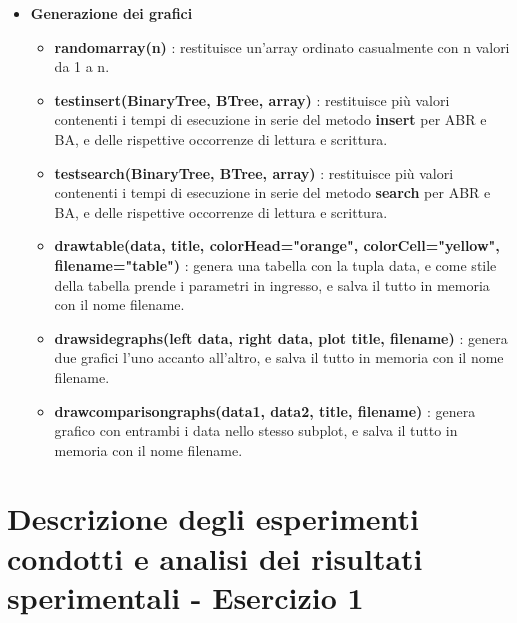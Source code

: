 \begin{itemize}
\begin{itemize}
    \end{itemize}
    
    \item \textbf{Generazione dei grafici}
    \begin{itemize}
    
        \item \textbf{random\textunderscore array(n)} : restituisce un'array ordinato casualmente con n valori da 1 a n.
        
        \item \textbf{test\textunderscore insert(BinaryTree, BTree, array)} : restituisce più valori contenenti i tempi di esecuzione in serie del metodo \textbf{insert} per ABR e BA, e delle rispettive occorrenze di lettura e scrittura. 
        
        \item \textbf{test\textunderscore search(BinaryTree, BTree, array)} : restituisce più valori contenenti i tempi di esecuzione in serie del metodo \textbf{search} per ABR e BA, e delle rispettive occorrenze di lettura e scrittura.
        
        \item \textbf{draw\textunderscore table(data, title, colorHead="orange", colorCell="yellow", filename="table")} : genera una tabella con la tupla data, e come stile della tabella prende i parametri in ingresso, e salva il tutto in memoria con il nome filename.
        
        \item \textbf{draw\textunderscore side\textunderscore graphs(left data, right data, plot title, filename)} : genera due grafici l'uno accanto all'altro, e salva il tutto in memoria con il nome filename.
        
        \item \textbf{draw\textunderscore comparison\textunderscore graphs(data1, data2, title, filename)} : genera grafico con entrambi i data nello stesso subplot, e salva il tutto in memoria con il nome filename.
        
    \end{itemize}
    
\end{itemize}

\newpage
\section{Descrizione degli esperimenti condotti e analisi dei risultati sperimentali - Esercizio 1}

